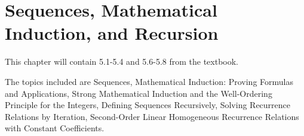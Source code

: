 \documentclass[../discrete.tex]{subfiles}
\begin{document}
\chapter{Sequences, Mathematical Induction, and Recursion}
This chapter will contain 5.1-5.4 and 5.6-5.8 from the textbook.

The topics included are Sequences, Mathematical Induction: Proving Formulas and Applications, Strong Mathematical Induction and the Well-Ordering Principle for the Integers, Defining Sequences Recursively, Solving Recurrence Relations by Iteration, Second-Order Linear Homogeneous Recurrence Relations with Constant Coefficients.
\end{document}
